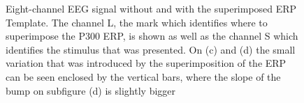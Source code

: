 \documentclass[brainsci,article,submit,moreauthors,pdftex,10pt,a4paper]{mdpi}
\begin{document}
\begin{figure}[htb]
\centering
{}
\caption{Eight-channel EEG signal without and with the superimposed ERP Template. The channel L, the mark which identifies where to superimpose the P300 ERP, is shown as well as the channel S which identifies the stimulus that was presented. On (c) and (d) the small variation that was introduced by the superimposition of the ERP can be seen enclosed by the vertical bars, where the slope of the bump on subfigure (d) is slightly bigger}
\label{fig:gains}
\end{figure}


\end{document}
